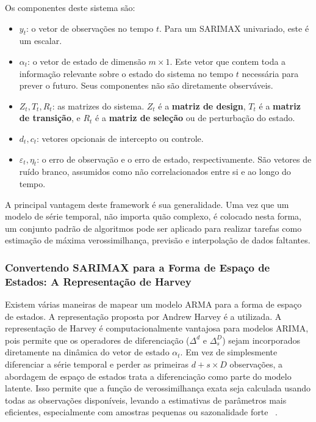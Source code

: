 \documentclass[ 12pt,a4paper ]{article} %
\begin{document}
	Os componentes deste sistema são:
	\begin{itemize}
		\item $y_t$: o vetor de observações no tempo $t$. Para um SARIMAX univariado, este é um escalar.
		
		\item $\alpha_t$: o vetor de estado de dimensão $m \times 1$. Este vetor que contem toda a informação relevante sobre o estado do sistema no tempo $t$ necessária para prever o futuro. Seus componentes não são diretamente observáveis.
		
		\item $Z_t, T_t, R_t$: as matrizes do sistema. $Z_t$ é a \textbf{matriz de design}, $T_t$ é a \textbf{matriz de transição}, e $R_t$ é a \textbf{matriz de seleção} ou de perturbação do estado.
		
		\item $d_t, c_t$: vetores opcionais de intercepto ou controle.
		
		\item $\varepsilon_t, \eta_t$: o erro de observação e o erro de estado, respectivamente. São vetores de ruído branco, assumidos como não correlacionados entre si e ao longo do tempo.
	\end{itemize}
	
	A principal vantagem deste framework é sua generalidade. Uma vez que um modelo de série temporal, não importa quão complexo, é colocado nesta forma, um conjunto padrão de algoritmos pode ser aplicado para realizar tarefas como estimação de máxima verossimilhança, previsão e interpolação de dados faltantes.
	
	\subsubsection{Convertendo SARIMAX para a Forma de Espaço de Estados: A Representação de Harvey}
	
	Existem várias maneiras de mapear um modelo ARMA para a forma de espaço de estados. A representação proposta por Andrew Harvey é a utilizada. A representação de Harvey é computacionalmente vantajosa para modelos ARIMA, pois permite que os operadores de diferenciação ($\Delta^d$ e $\Delta_s^D$) sejam incorporados diretamente na dinâmica do vetor de estado $\alpha_t$. Em vez de simplesmente diferenciar a série temporal e perder as primeiras $d + s \times D$ observações, a abordagem de espaço de estados trata a diferenciação como parte do modelo latente. Isso permite que a função de verossimilhança exata seja calculada usando todas as observações disponíveis, levando a estimativas de parâmetros mais eficientes, especialmente com amostras pequenas ou sazonalidade forte ~\cite{statsmodels}. 
	
\end{document}
